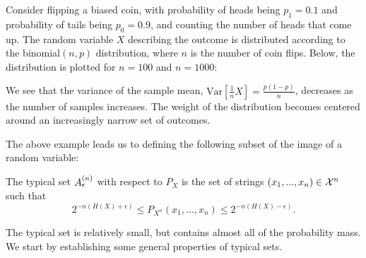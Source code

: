 \begin{example}
Consider flipping a biased coin, with probability of heads being $p_1 = 0.1$ and probability of tails being $p_0 = 0.9$, and counting the number of heads that come up. The random variable $X$ describing the outcome is distributed according to the binomial$(n,p)$ distribution, where $n$ is the number of coin flips. Below, the distribution is plotted for $n = 100$ and $n = 1000$:
\begin{center}
\end{center}
We see that the variance of the sample mean, $\mbox{Var}[\frac{1}{n}X] = \frac{p(1-p)}{n}$, decreases as the number of samples increases. The weight of the distribution becomes centered around an increasingly narrow set of outcomes.
\end{example}
The above example leads us to defining the following subset of the image of a random variable:

\begin{definition}
The typical set $A_{\epsilon}^{(n)}$ with respect to $P_X$ is the set of strings $(x_1, ..., x_n) \in {\cal X}^n$ such that
\[
2^{-n (H(X) + \epsilon)} \leq P_{X^n}(x_1, ..., x_n) \leq 2^{-n(H(X) - \epsilon)}.
\]
\end{definition}
The typical set is relatively small, but contains almost all of the probability mass. We start by establishing some general properties of typical sets.

